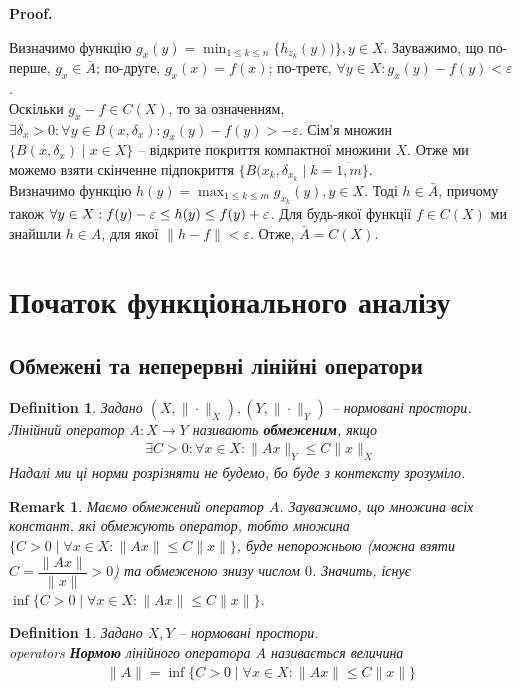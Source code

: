 \documentclass[a4paper, 10pt]{article}
\makeatletter
\theoremstyle{theoremdd}
\theoremstyle{theoremdd}
\newtheorem{definition}[theorem]{Definition}
\theoremstyle{theoremdd}
\theoremstyle{theoremdd}
\theoremstyle{theoremdd}
\theoremstyle{theoremdd}
\newtheorem{remark}[theorem]{Remark}
\theoremstyle{theoremdd}
\theoremstyle{theoremdd}
\renewenvironment{proof}[1][Proof.\\]{\par
\pushQED{\hfill \qed}%
\normalfont \topsep6\p@\@plus6\p@\relax
\trivlist
\item\relax
{\bfseries
#1\@addpunct{.}}\hspace\labelsep\ignorespaces
}{%
\popQED\endtrivlist\@endpefalse
}
\makeatother
\begin{document}
\begin{proof}
Визначимо функцію $g_x(y) = \displaystyle\min_{1 \leq k \leq n} \{h_{z_k}(y))\}, y \in X$. Зауважимо, що по-перше, $g_x \in \bar{A}$; по-друге, $g_x(x) = f(x)$; по-третє, $\forall y \in X: g_x(y) -f(y) < \varepsilon$.\\
Оскільки $g_x - f \in C(X)$, то за означенням, $\exists \delta_x > 0: \forall y \in B(x,\delta_x): g_x(y) - f(y) > - \varepsilon$. Сім'я множин $\{B(x,\delta_x) \mid x \in X \}$ -- відкрите покриття компактної множини $X$. Отже ми можемо взяти скінченне підпокриття $\{B(x_k,\delta_{x_k} \mid k = \overline{1,m}\}$.\\
Визначимо функцію $h(y) = \displaystyle\max_{1 \leq k \leq m} g_{x_k}(y), y \in X$. Тоді $h \in \bar{A}$, причому також $\forall y \in X: \\ f(y) - \varepsilon \leq h(y) \leq f(y) + \varepsilon$. Для будь-якої функції $f \in C(X)$ ми знайшли $h \in A$, для якої $\|h - f\| < \varepsilon$. Отже, $\bar{A} = C(X)$.
\end{proof}
\newpage

\section{Початок функціонального аналізу}
\subsection{Обмежені та неперервні лінійні оператори}
\begin{definition}
Задано $(X, \|\cdot \|_X),(Y, \| \cdot \|_Y)$ -- нормовані простори.\\
Лінійний оператор $A \colon X \to Y$ називають \textbf{обмеженим}, якщо
\begin{align*}
\exists C > 0: \forall x \in X: \| Ax \|_Y \leq C \| x \|_X
\end{align*}
Надалі ми ці норми розрізняти не будемо, бо буде з контексту зрозуміло.
\end{definition}

\begin{remark}
Маємо обмежений оператор $A$. Зауважимо, що множина всіх констант, які обмежують оператор, тобто множина $\{C > 0 \mid \forall x \in X: \| Ax\| \leq C \|x\|\}$, буде непорожньою (можна взяти $C = \dfrac{\|Ax\|}{\|x\|} > 0$) та обмеженою знизу числом $0$. Значить, існує $\displaystyle\inf\{C > 0 \mid \forall x \in X: \| Ax\| \leq C \|x\|\}$.
\end{remark}

\begin{definition}
Задано $X,Y$ -- нормовані простори.\\operators
\textbf{Нормою} лінійного оператора $A$ називається величина
\begin{align*}
 \| A\| = \inf \{C > 0 \mid \forall x \in X: \| Ax \| \leq C \|x\|\}
\end{align*}
\end{definition}
\end{document}
